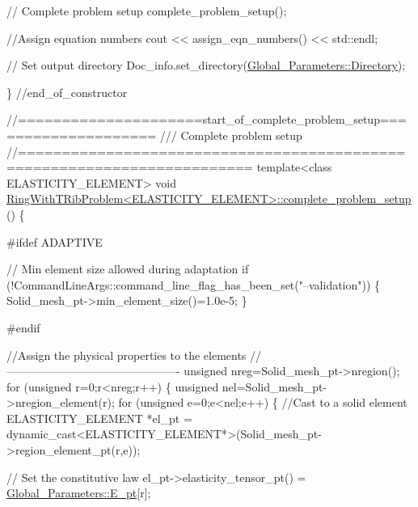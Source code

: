 \begin{DoxyCodeInclude}
 \textcolor{comment}{// Complete problem setup}
 complete\_problem\_setup();

 \textcolor{comment}{//Assign equation numbers}
 cout << assign\_eqn\_numbers() << std::endl; 

 \textcolor{comment}{// Set output directory}
 Doc\_info.set\_directory(\hyperlink{namespaceGlobal__Parameters_a301ab922df72030c660b21328d6caf76}{Global\_Parameters::Directory});

\} \textcolor{comment}{//end\_of\_constructor}




\textcolor{comment}{//=====================start\_of\_complete\_problem\_setup====================}\textcolor{comment}{}
\textcolor{comment}{/// Complete problem setup}
\textcolor{comment}{}\textcolor{comment}{//========================================================================}
\textcolor{keyword}{template}<\textcolor{keyword}{class} ELASTICITY\_ELEMENT>
\textcolor{keywordtype}{void} \hyperlink{classRingWithTRibProblem_a7aa8c978ec6ff0a9823ef895b263fb41}{RingWithTRibProblem<ELASTICITY\_ELEMENT>::complete\_problem\_setup}
      ()
\{

\textcolor{preprocessor}{#ifdef ADAPTIVE}

 \textcolor{comment}{// Min element size allowed during adaptation}
 \textcolor{keywordflow}{if} (!CommandLineArgs::command\_line\_flag\_has\_been\_set(\textcolor{stringliteral}{"--validation"}))
  \{   
   Solid\_mesh\_pt->min\_element\_size()=1.0e-5;
  \}

\textcolor{preprocessor}{#endif}

 \textcolor{comment}{//Assign the physical properties to the elements}
 \textcolor{comment}{//----------------------------------------------}
 \textcolor{keywordtype}{unsigned} nreg=Solid\_mesh\_pt->nregion();
 \textcolor{keywordflow}{for} (\textcolor{keywordtype}{unsigned} r=0;r<nreg;r++)
  \{
   \textcolor{keywordtype}{unsigned} nel=Solid\_mesh\_pt->nregion\_element(r);
   \textcolor{keywordflow}{for} (\textcolor{keywordtype}{unsigned} e=0;e<nel;e++)
    \{     
     \textcolor{comment}{//Cast to a solid element}
     ELASTICITY\_ELEMENT *el\_pt = 
      \textcolor{keyword}{dynamic\_cast<}ELASTICITY\_ELEMENT*\textcolor{keyword}{>}(Solid\_mesh\_pt->region\_element\_pt(r,e));

     \textcolor{comment}{// Set the constitutive law}
     el\_pt->elasticity\_tensor\_pt() = \hyperlink{namespaceGlobal__Parameters_a73c731fa617a9d92851e4195493262e7}{Global\_Parameters::E\_pt}[r];


\end{DoxyCodeInclude}
